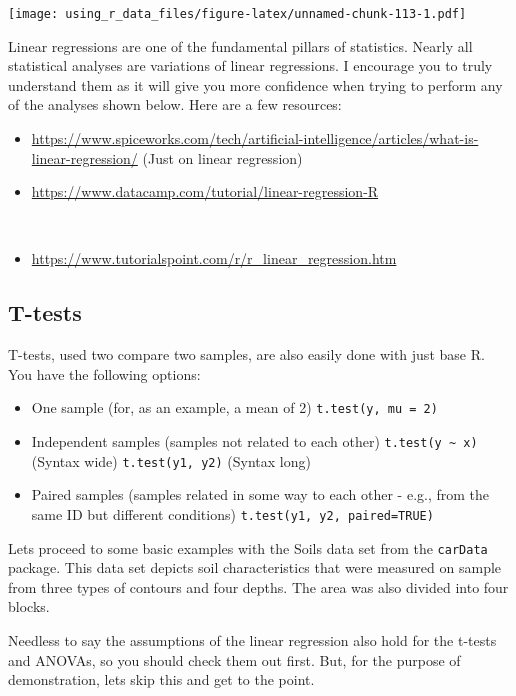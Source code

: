 \documentclass[
]{book}
\providecommand{\tightlist}{%
  \setlength{\itemsep}{0pt}\setlength{\parskip}{0pt}}
\begin{document}
\texttt{[image: using\_r\_data\_files/figure-latex/unnamed-chunk-113-1.pdf]}

Linear regressions are one of the fundamental pillars of statistics. Nearly all statistical analyses are variations of linear regressions. I encourage you to truly understand them as it will give you more confidence when trying to perform any of the analyses shown below. Here are a few resources:\\

\begin{itemize}
\tightlist
\item
  \url{https://www.spiceworks.com/tech/artificial-intelligence/articles/what-is-linear-regression/} (Just on linear regression)\\
\item
  \url{https://www.datacamp.com/tutorial/linear-regression-R}\strut \\
\item
  \url{https://www.tutorialspoint.com/r/r_linear_regression.htm}
\end{itemize}

\hypertarget{t-tests}{%
\subsection{T-tests}\label{t-tests}}

T-tests, used two compare two samples, are also easily done with just base R.
You have the following options:

\begin{itemize}
\item
  One sample (for, as an example, a mean of 2)
  \texttt{t.test(y,\ mu\ =\ 2)}
\item
  Independent samples (samples not related to each other)
  \texttt{t.test(y\ \textasciitilde{}\ x)} (Syntax wide)
  \texttt{t.test(y1,\ y2)} (Syntax long)
\item
  Paired samples (samples related in some way to each other - e.g., from the same ID but different conditions)
  \texttt{t.test(y1,\ y2,\ paired=TRUE)}
\end{itemize}

Lets proceed to some basic examples with the Soils data set from the \texttt{carData} package. This data set depicts soil characteristics that were measured on sample from three types of contours and four depths. The area was also divided into four blocks.

Needless to say the assumptions of the linear regression also hold for the t-tests and ANOVAs, so you should check them out first. But, for the purpose of demonstration, lets skip this and get to the point.
\end{document}
